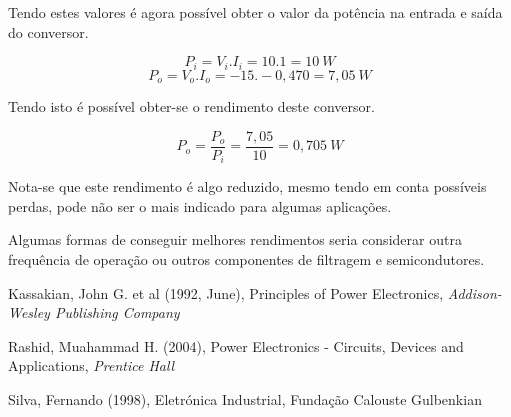 \documentclass[a4paper,11pt]{article}
\numberwithin{equation}{section}
\begin{document}
Tendo estes valores é agora possível obter o valor da potência na entrada e saída do conversor.

\begin{equation}
P_i = V_i . I_i = 10 . 1 = 10 ~ W
\end{equation}
\vspace{-0,8 cm}
\begin{equation}
P_o = V_o . I_o = -15 . -0,470 = 7,05 ~ W
\end{equation}

Tendo isto é possível obter-se o rendimento deste conversor.

\begin{equation}
P_o = \frac{P_o}{P_i} = \frac{7,05}{10} = 0,705 ~ W
\end{equation}

Nota-se que este rendimento é algo reduzido, mesmo tendo em conta possíveis perdas, pode não ser o mais indicado para algumas aplicações.

Algumas formas de conseguir melhores rendimentos seria considerar outra frequência de operação ou outros componentes de filtragem e semicondutores.

\pagebreak

\begin{thebibliography}{2}
	
	Kassakian, John G. et al (1992, June), Principles of Power Electronics, \textit{Addison-Wesley Publishing Company}

	Rashid, Muahammad H. (2004), Power Electronics - Circuits, Devices and Applications, \textit{Prentice Hall}
	
	Silva, Fernando (1998), Eletrónica Industrial, Fundação Calouste Gulbenkian
	
\end{thebibliography}


\pagebreak
\end{document}
